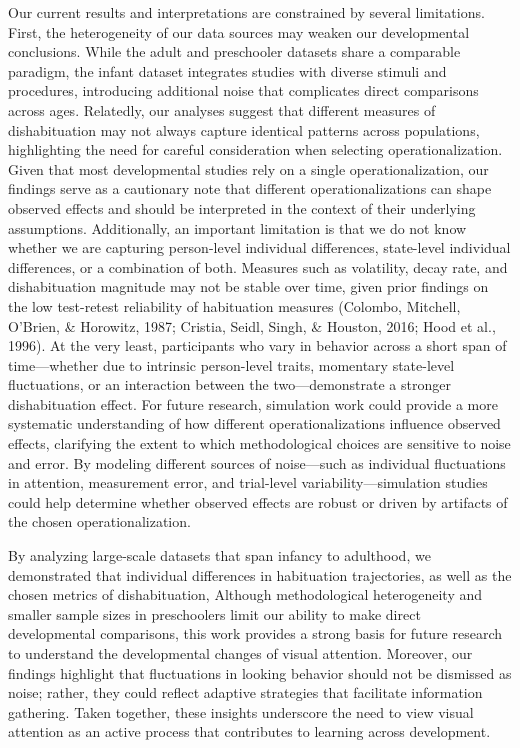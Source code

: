 \documentclass[10pt, letterpaper]{article}
\begin{document}
Our current results and interpretations are constrained by several
limitations. First, the heterogeneity of our data sources may weaken our
developmental conclusions. While the adult and preschooler datasets
share a comparable paradigm, the infant dataset integrates studies with
diverse stimuli and procedures, introducing additional noise that
complicates direct comparisons across ages. Relatedly, our analyses
suggest that different measures of dishabituation may not always capture
identical patterns across populations, highlighting the need for careful
consideration when selecting operationalization. Given that most
developmental studies rely on a single operationalization, our findings
serve as a cautionary note that different operationalizations can shape
observed effects and should be interpreted in the context of their
underlying assumptions. Additionally, an important limitation is that we
do not know whether we are capturing person-level individual
differences, state-level individual differences, or a combination of
both. Measures such as volatility, decay rate, and dishabituation
magnitude may not be stable over time, given prior findings on the low
test-retest reliability of habituation measures (Colombo, Mitchell,
O'Brien, \& Horowitz, 1987; Cristia, Seidl, Singh, \& Houston, 2016;
Hood et al., 1996). At the very least, participants who vary in behavior
across a short span of time---whether due to intrinsic person-level
traits, momentary state-level fluctuations, or an interaction between
the two---demonstrate a stronger dishabituation effect. For future
research, simulation work could provide a more systematic understanding
of how different operationalizations influence observed effects,
clarifying the extent to which methodological choices are sensitive to
noise and error. By modeling different sources of noise---such as
individual fluctuations in attention, measurement error, and trial-level
variability---simulation studies could help determine whether observed
effects are robust or driven by artifacts of the chosen
operationalization.

By analyzing large-scale datasets that span infancy to adulthood, we
demonstrated that individual differences in habituation trajectories, as
well as the chosen metrics of dishabituation, Although methodological
heterogeneity and smaller sample sizes in preschoolers limit our ability
to make direct developmental comparisons, this work provides a strong
basis for future research to understand the developmental changes of
visual attention. Moreover, our findings highlight that fluctuations in
looking behavior should not be dismissed as noise; rather, they could
reflect adaptive strategies that facilitate information gathering. Taken
together, these insights underscore the need to view visual attention as
an active process that contributes to learning across development.
\end{document}
